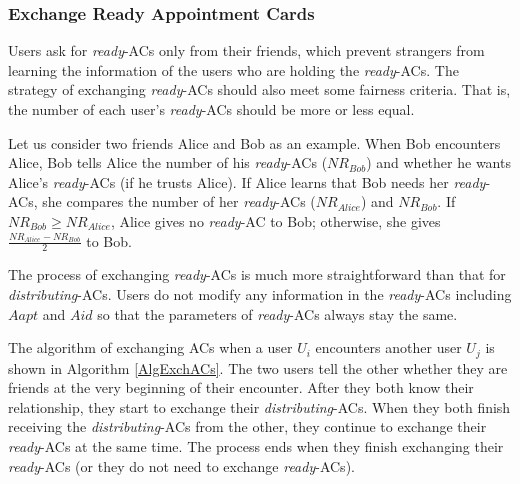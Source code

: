 \documentclass[conference]{IEEEtran}
\begin{document}
\subsubsection{ Exchange Ready Appointment Cards}

Users ask for \textit{ready}-ACs only from their friends, which prevent strangers from learning the information of the users who are holding the \textit{ready}-ACs. The strategy of exchanging \textit{ready}-ACs should also meet some fairness criteria. That is, the number of each user's \textit{ready}-ACs should be more or less equal. 

Let us consider two friends Alice and Bob as an example. When Bob encounters Alice, Bob tells Alice the number of his \textit{ready}-ACs (${NR}_{Bob}$) and whether he wants Alice's \textit{ready}-ACs (if he trusts Alice). If Alice learns that Bob needs her \textit{ready}-ACs, she compares the number of her \textit{ready}-ACs (${NR}_{Alice}$) and ${NR}_{Bob}$. If ${NR}_{Bob}\ge {NR}_{Alice}$, Alice gives no \textit{ready}-AC to Bob; otherwise, she gives $\frac{{NR}_{Alice}-{NR}_{Bob}}{2}$ to Bob.

The process of exchanging \textit{ready}-ACs is much more straightforward than that for \textit{distributing}-ACs. Users do not modify any information in the \textit{ready}-ACs including $Aapt$ and $Aid$ so that the parameters of \textit{ready}-ACs always stay the same.

The algorithm of exchanging ACs when a user $U_i$ encounters another user $U_j$ is shown in Algorithm \ref{AlgExchACs}. The two users tell the other whether they are friends at the very beginning of their encounter. After they both know their relationship, they start to exchange their \textit{distributing}-ACs. When they both finish receiving the \textit{distributing}-ACs from the other, they continue to exchange their \textit{ready}-ACs at the same time. The process ends when they finish exchanging their \textit{ready}-ACs (or they do not need to exchange \textit{ready}-ACs).
\end{document}
